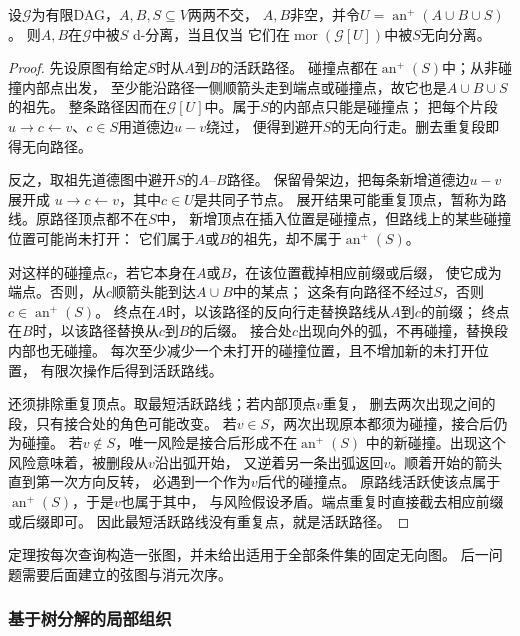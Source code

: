 \begin{theorem}[祖先道德化判据]
  \label{thm:graph-theory-ancestral-moralization}
  设\(\mathcal G\)为有限DAG，\(A,B,S\subseteq V\)两两不交，
  \(A,B\)非空，并令\(U=\operatorname{an}^{+}(A\cup B\cup S)\)。
  则\(A,B\)在\(\mathcal G\)中被\(S\) d-分离，当且仅当
  它们在\(\operatorname{mor}(\mathcal G[U])\)中被\(S\)无向分离。
\end{theorem}

\begin{proof}
先设原图有给定\(S\)时从\(A\)到\(B\)的活跃路径。
碰撞点都在\(\operatorname{an}^{+}(S)\)中；从非碰撞内部点出发，
至少能沿路径一侧顺箭头走到端点或碰撞点，故它也是\(A\cup B\cup S\)的祖先。
整条路径因而在\(\mathcal G[U]\)中。属于\(S\)的内部点只能是碰撞点；
把每个片段\(u\to c\leftarrow v\)、\(c\in S\)用道德边\(u-v\)绕过，
便得到避开\(S\)的无向行走。删去重复段即得无向路径。

反之，取祖先道德图中避开\(S\)的\(A\)--\(B\)路径。
保留骨架边，把每条新增道德边\(u-v\)展开成
\(u\to c\leftarrow v\)，其中\(c\in U\)是共同子节点。
展开结果可能重复顶点，暂称为路线。原路径顶点都不在\(S\)中，
新增顶点在插入位置是碰撞点，但路线上的某些碰撞位置可能尚未打开：
它们属于\(A\)或\(B\)的祖先，却不属于\(\operatorname{an}^{+}(S)\)。

对这样的碰撞点\(c\)，若它本身在\(A\)或\(B\)，在该位置截掉相应前缀或后缀，
使它成为端点。否则，从\(c\)顺箭头能到达\(A\cup B\)中的某点；
这条有向路径不经过\(S\)，否则\(c\in\operatorname{an}^{+}(S)\)。
终点在\(A\)时，以该路径的反向行走替换路线从\(A\)到\(c\)的前缀；
终点在\(B\)时，以该路径替换从\(c\)到\(B\)的后缀。
接合处\(c\)出现向外的弧，不再碰撞，替换段内部也无碰撞。
每次至少减少一个未打开的碰撞位置，且不增加新的未打开位置，
有限次操作后得到活跃路线。

还须排除重复顶点。取最短活跃路线；若内部顶点\(v\)重复，
删去两次出现之间的段，只有接合处的角色可能改变。
若\(v\in S\)，两次出现原本都须为碰撞，接合后仍为碰撞。
若\(v\notin S\)，唯一风险是接合后形成不在\(\operatorname{an}^{+}(S)\)
中的新碰撞。出现这个风险意味着，被删段从\(v\)沿出弧开始，
又逆着另一条出弧返回\(v\)。顺着开始的箭头直到第一次方向反转，
必遇到一个作为\(v\)后代的碰撞点。
原路线活跃使该点属于\(\operatorname{an}^{+}(S)\)，于是\(v\)也属于其中，
与风险假设矛盾。端点重复时直接截去相应前缀或后缀即可。
因此最短活跃路线没有重复点，就是活跃路径。
\end{proof}

定理按每次查询构造一张图，并未给出适用于全部条件集的固定无向图。
后一问题需要后面建立的弦图与消元次序。

\subsubsection{基于树分解的局部组织}
\label{sec:graph-theory-tree-decomposition}

